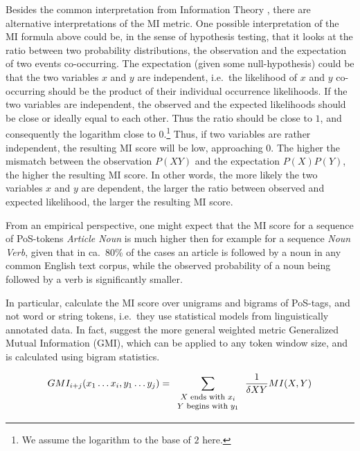 \documentclass[11pt,a4paper,english]{article}
\begin{document}
Besides the common interpretation from Information Theory \citep{MacKay:2003}, there are alternative interpretations of the MI metric. One possible interpretation of the MI formula above could be, in the sense of hypothesis testing, that it looks at the ratio between two probability distributions, the observation and the expectation of two events co-occurring. The expectation (given some null-hypothesis) could be that the two variables $x$ and $y$ are independent, i.e.\ the likelihood of $x$ and $y$ co-occurring should be the product of their individual occurrence likelihoods. If the two variables are independent, the observed and the expected likelihoods should be close or ideally equal to each other. Thus the ratio should be close to $1$, and consequently the logarithm close to $0$.\footnote{We assume the logarithm to the base of $2$ here.} Thus, if two variables are rather independent, the resulting MI score will be low, approaching $0$. The higher the mismatch between the observation $P(XY)$ and the expectation $P(X)P(Y)$, the higher the resulting MI score. In other words, the more likely the two variables $x$ and $y$ are dependent, the larger the ratio between observed and expected likelihood, the larger the resulting MI score.

From an empirical perspective, one might expect that the MI score for a sequence of PoS-tokens \textit{Article Noun} is much higher then for example for a sequence \textit{Noun Verb}, given that in ca.\ 80\% of the cases an article is followed by a noun in any common English text corpus, while the observed probability of a noun being followed by a verb is significantly smaller.

In particular, \cite{Magerman:Marcus:1990} calculate the MI score over unigrams and bigrams of PoS-tags, and not word or string tokens, i.e.\ they use statistical models from linguistically annotated data. In fact, \cite{Magerman:Marcus:1990} suggest the more general weighted metric Generalized Mutual Information (GMI), which can be applied to any token window size, and is calculated using bigram statistics.

\begin{equation}
GMI_{i+j}(x_1 \dots{} x_i,y_1 \dots{} y_j)=\sum_{\footnotesize\begin{array}{c}
X \mbox{ ends with } x_i\\
Y \mbox{ begins with } y_1
\end{array}} \frac{1}{\delta{}XY} MI(X,Y) 
\end{equation}
\end{document}
